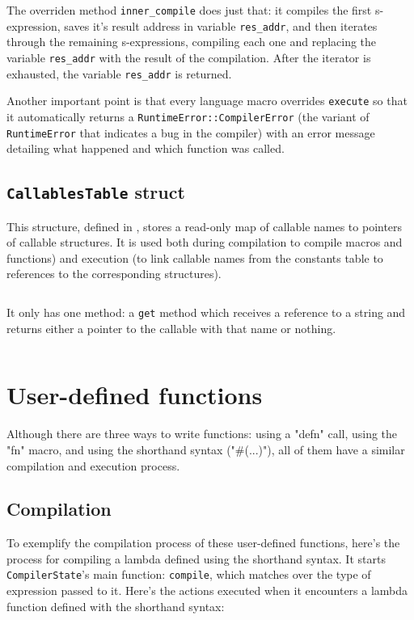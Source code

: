 \documentclass[11pt]{scrreprt}
\begin{document}
The overriden method \texttt{inner\_compile} does just that: it compiles the first s-expression, saves it's result address in variable \texttt{res\_addr}, and then iterates through the remaining s-expressions, compiling each one and replacing the variable \texttt{res\_addr} with the result of the compilation. After the iterator is exhausted, the variable \texttt{res\_addr} is returned.

Another important point is that every language macro overrides \texttt{execute} so that it automatically returns a \texttt{RuntimeError::CompilerError} (the variant of \texttt{RuntimeError} that indicates a bug in the compiler) with an error message detailing what happened and which function was called.

\subsection{\texttt{CallablesTable} struct}
This structure, defined in , stores a read-only map of callable names to pointers of callable structures. It is used both during compilation to compile macros and functions) and execution (to link callable names from the constants table to references to the corresponding structures).

\inputminted[firstline=47,lastline=48]{rust}{/home/mario/git/MarioJim/miniclj/miniclj-lib/src/callables/mod.rs}

It only has one method: a \texttt{get} method which receives a reference to a string and returns either a pointer to the callable with that name or nothing.

\inputminted[firstline=116,lastline=120]{rust}{/home/mario/git/MarioJim/miniclj/miniclj-lib/src/callables/mod.rs}

\section{User-defined functions}
Although there are three ways to write functions: using a "defn" call, using the "fn" macro, and using the shorthand syntax ("\#(...)"), all of them have a similar compilation and execution process.

\subsection{Compilation}
To exemplify the compilation process of these user-defined functions, here's the process for compiling a lambda defined using the shorthand syntax. It starts \texttt{CompilerState}'s main function: \texttt{compile}, which matches over the type of expression passed to it. Here's the actions executed when it encounters a lambda function defined with the shorthand syntax:
\end{document}

